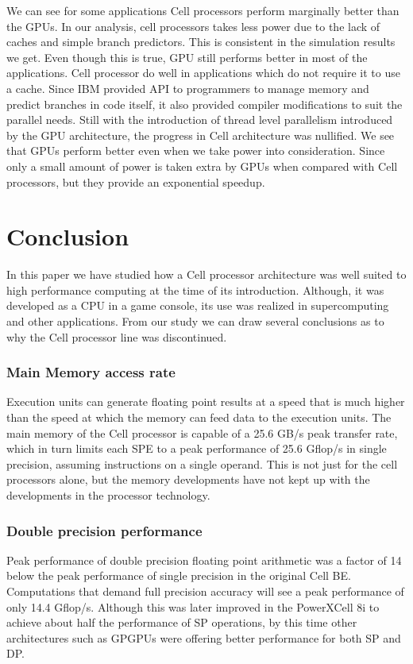 \documentclass{sig-alternate-05-2015}
\begin{document}
We can see for some applications Cell processors perform marginally better than the GPUs. In our analysis, cell processors takes less power due to the lack of caches and simple branch predictors. This is consistent in the simulation results we get. Even though this is true, GPU still performs better in most of the applications. Cell processor do well in applications which do not require it to use a cache. Since IBM provided API to programmers to manage memory and predict branches in code itself, it also provided compiler modifications to suit the parallel needs. Still with the introduction of thread level parallelism introduced by the GPU architecture, the progress in Cell architecture was nullified. We see that GPUs perform better even when we take power into consideration. Since only a small amount of power is taken extra by GPUs when compared with Cell processors, but they provide an exponential speedup. 

\section{Conclusion}

In this paper we have studied how a Cell processor architecture was well suited to high performance computing at the time of its introduction. Although, it was developed as a CPU in a game console, its use was realized in supercomputing and other applications. From our study we can draw several conclusions as to why the Cell processor line was discontinued.

\subsubsection{Main Memory access rate}
Execution units can generate floating point results at a speed that is much higher than the speed at which the memory can feed data to the execution units. The main memory of the Cell processor is capable of a 25.6 GB/s peak transfer rate, which in turn limits each SPE to a peak performance of 25.6 Gflop/s in single precision, assuming instructions on a single operand. This is not just for the cell processors alone, but the memory developments have not kept up with the developments in the processor technology. 
 
\subsubsection{Double precision performance} 

Peak performance of double precision floating point arithmetic was a factor of 14 below the peak performance of single precision in the original Cell BE. Computations that demand full precision accuracy will see a peak performance of only 14.4 Gflop/s. Although this was later improved in the PowerXCell 8i to achieve about half the performance of SP operations, by this time other architectures such as GPGPUs were offering better performance for both SP and DP.
 
\end{document}
